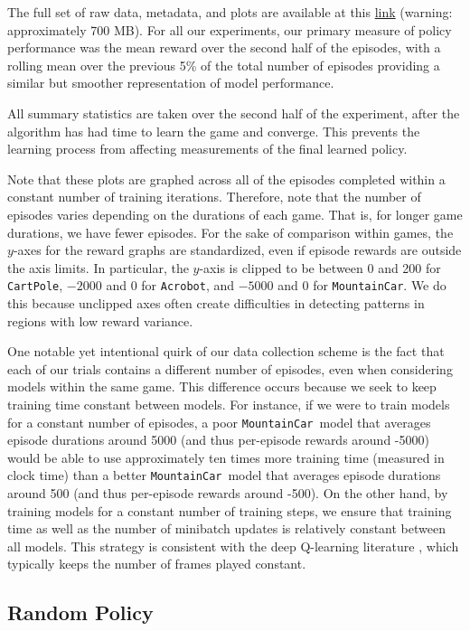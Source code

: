 \documentclass[11pt]{article}
\newcommand{\cp}{\texttt{CartPole}}
\newcommand{\ab}{\texttt{Acrobot}}
\newcommand{\mc}{\texttt{MountainCar}}
\begin{document}
The full set of raw data, metadata, and plots are available at this \href{https://github.com/hahakumquat/stat234-project/tree/master/data}{link} (warning: approximately 700 MB). For all our experiments, our primary measure of policy performance was the mean reward over the second half of the episodes, with a rolling mean over the previous 5\% of the total number of episodes providing a similar but smoother representation of model performance.

All summary statistics are taken over the second half of the experiment, after the algorithm has had time to learn the game and converge. This prevents the learning process from affecting measurements of the final learned policy.

Note that these plots are graphed across all of the episodes completed within a constant number of training iterations. Therefore, note that the number of episodes varies depending on the durations of each game. That is, for longer game durations, we have fewer episodes. For the sake of comparison within games, the $y$-axes for the reward graphs are standardized, even if episode rewards are outside the axis limits. In particular, the $y$-axis is clipped to be between 0 and 200 for \cp, $-2000$ and 0 for \ab, and $-5000$ and 0 for \mc. We do this because unclipped axes often create difficulties in detecting patterns in regions with low reward variance. 

One notable yet intentional quirk of our data collection scheme is the fact that each of our trials contains a different number of episodes, even when considering models within the same game. This difference occurs because we seek to keep training time constant between models. For instance, if we were to train models for a constant number of episodes, a poor \mc~model that averages episode durations around 5000 (and thus per-episode rewards around -5000) would be able to use approximately ten times more training time (measured in clock time) than a better \mc~model that averages episode durations around 500 (and thus per-episode rewards around -500). On the other hand, by training models for a constant number of training steps, we ensure that training time as well as the number of minibatch updates is relatively constant between all models. This strategy is consistent with the deep Q-learning literature \cite{mnih2013playing, mnih2015human, van2016deep}, which typically keeps the number of frames played constant.

\subsection{Random Policy}
\end{document}
